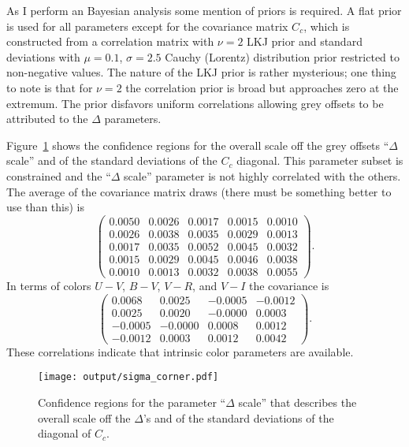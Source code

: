 \documentclass[11pt, oneside]{article}   	%
\begin{document}
As I perform an Bayesian analysis some mention of priors is required.  A flat prior is used for all parameters except
for the covariance matrix $C_c$, which is constructed from a correlation matrix with  $\nu=2$  LKJ prior and standard
deviations with
 $\mu=0.1$, $\sigma=2.5$ Cauchy (Lorentz) distribution prior restricted to non-negative values.
The nature of the LKJ prior is rather mysterious; one thing to note is that for $\nu=2$ the correlation prior is broad but
approaches zero at the extremum.  The prior disfavors uniform correlations allowing grey offsets to be attributed to the $\Delta$ parameters.

Figure~\ref{sigma:fig} shows the confidence regions for 
 the overall scale off the grey offsets
 ``$\Delta$ scale''
and of the standard deviations of the $C_c$ diagonal.  This parameter subset is constrained and the  ``$\Delta$ scale'' parameter
is not highly correlated with the others.  The average
of the covariance matrix draws (there must be something better to use than this) is 
\begin{equation}
\begin{pmatrix}
0.0050 & 0.0026 & 0.0017 & 0.0015 & 0.0010 \\
0.0026 & 0.0038 & 0.0035 & 0.0029 & 0.0013 \\
0.0017 & 0.0035 & 0.0052 & 0.0045 & 0.0032 \\
0.0015 & 0.0029 & 0.0045 & 0.0046 & 0.0038 \\
0.0010 & 0.0013 & 0.0032 & 0.0038 & 0.0055
 \end{pmatrix}.
 \end{equation}
 In terms of colors $U-V$, $B-V$, $V-R$, and $V-I$ the covariance is
\begin{equation}
\begin{pmatrix}
 0.0068 & 0.0025 & -0.0005 & -0.0012 \\
0.0025 & 0.0020 & -0.0000 & 0.0003 \\
-0.0005 & -0.0000 & 0.0008 & 0.0012 \\
-0.0012 & 0.0003 & 0.0012 & 0.0042
  \end{pmatrix}.
 \end{equation}
These correlations indicate that intrinsic color parameters are available. 
  
\begin{figure}[htbp] %
   \centering
   \texttt{[image: output/sigma\_corner.pdf]} 
   \caption{Confidence regions for the parameter ``$\Delta$ scale'' that describes the overall scale off the $\Delta$'s
and of the standard deviations of the diagonal of $C_c$.}
   \label{sigma:fig}
\end{figure}
\end{document}
